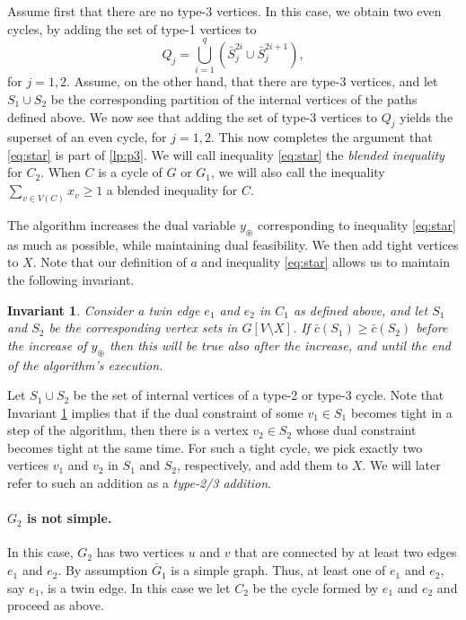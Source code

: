 \documentclass{article}
\newcommand{\0}{\mathbb{0}}
\newcommand{\1}{\mathbb{1}}
\newtheorem{inva}[theorem]{Invariant}
\begin{document}
Assume first that there are no type-3 vertices. In this case, we obtain two
even cycles, by adding the set of type-1 vertices to  
\[ Q_j =
\bigcup_{i=1}^q(\bar{S}^{2i}_j \cup \bar{S}^{2i+1}_j), \]  
for $j=1,2$. 
Assume, on the other hand, that there are type-3 vertices, and let $S_1 \cup S_2$ be the
corresponding partition of the internal vertices of the paths defined above. 
We now see that adding the set of type-3 vertices to $Q_j$ yields the superset
of an even cycle, for $j=1,2$. This now completes the argument that \eqref{eq:star} is
part of \ref{lp:p3}.  We will call inequality \ref{eq:star} the \emph{blended inequality} for $C_2$. When $ C$ is a cycle of $G$ or $G_1$, we will also call the inequality $ \sum_{v \in V(C)} x_v \geq 1 $ a blended inequality for $C$.

The algorithm increases the dual variable $y_{\circledast}$ corresponding to
inequality \eqref{eq:star} as much as possible, while maintaining dual feasibility. 
We then add tight vertices to $X$. Note that our definition of $a$ and inequality 
\eqref{eq:star} allows us to maintain the following invariant.

\begin{inva}\label{inva}
  Consider a twin edge $e_1$ and $e_2$ in $C_1$ as defined above, and let $S_1$ and $S_2$
  be the corresponding vertex sets in $G[V\setminus X]$. If $\bar{c}(S_1) \geq \bar{c}
  (S_2)$ before the increase of $y_{\circledast}$ then this will be true also after the
  increase, and until the end of the algorithm's execution. 
\end{inva}

Let $S_1 \cup S_2$ be the set of internal vertices of a type-2 or type-3 cycle. Note that
Invariant \ref{inva} implies that if the dual constraint of some $v_1 \in S_1$ becomes
tight in a step of the algorithm, then there is a vertex $v_2 \in S_2$ whose dual
constraint becomes tight at the same time. For such a tight cycle, we pick exactly two
vertices
$v_1$ and $v_2$ in $S_1$ and $S_2$, respectively, and add them to $X$. We will later refer
to such an addition as a {\em type-2/3 addition}.

\paragraph{$G_2$ is not simple.}

In this case, $G_2$ has two vertices $u$ and $v$ that are connected by at least two edges
$e_1$ and $e_2$. By assumption $\bar{G}_1$ is a simple graph. Thus, at least one of $e_1$
and $e_2$, say $e_1$, is a twin edge. In this case we let $C_2$ be the cycle formed by
$e_1$ and $e_2$ and proceed as above.
\end{document}
